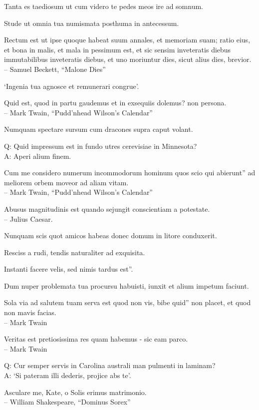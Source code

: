 \documentclass[titlepage,12pt]{memoir}
\begin{document}
Tanta es taediosum ut cum videro te pedes meos ire ad somnum.

Stude ut omnia tua numismata posthuma in antecessum.

Rectum est ut ipse quoque habeat suum annales, et memoriam suam;
ratio eius, et bona in malis, et mala in
pessimum est, et sic sensim inveteratis diebus immutabilibus inveteratis diebus, et uno moriuntur
dies, sicut alius dies, brevior.
\\-- Samuel Beckett, “Malone Dies”

‘Ingenia tua agnosce et remunerari congrue’.

Quid est, quod in partu gaudemus et in exsequiis dolemus?
non persona.
\\-- Mark Twain, “Pudd’nhead Wilson’s Calendar”

Numquam spectare sursum cum dracones supra caput volant.

Q: Quid impressum est in fundo utres cerevisiae in Minnesota?\\
A: Aperi alium finem.

Cum me considero numerum incommodorum hominum quos scio qui abierunt”
ad meliorem orbem moveor ad aliam vitam.
\\-- Mark Twain, “Pudd’nhead Wilson’s Calendar”

Abusus magnitudinis est quando sejungit conscientiam a potestate.
\\-- Julius Caesar.

Nunquam scis quot amicos habeas donec domum in litore conduxerit.

Resciss a rudi, tendis naturaliter ad exquisita.

Instanti facere velis, sed nimis tardus est”.

Dum nuper problemata tua procursu habuisti, iunxit et
alium impetum faciunt.

Sola via ad salutem tuam serva est quod non vis, bibe quid”
non placet, et quod non mavis facias.
\\-- Mark Twain

Veritas est pretiosissima res quam habemus - sic eam parco.
\\-- Mark Twain

Q: Cur semper servis in Carolina australi man
pulmenti in laminam?\\
A: ‘Si pateram illi dederis, projice abs te’.

Asculare me, Kate, o Solis erimus matrimonio.
\\-- William Shakespeare, “Dominus Sorex”
\end{document}
